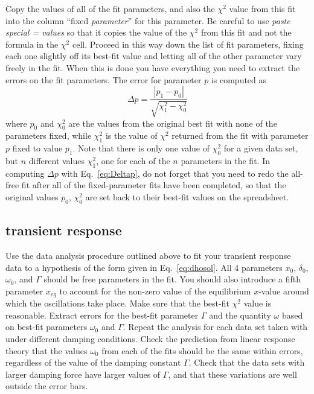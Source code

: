 \documentclass{revtex4}
\begin{document}
Copy the values
of all of the fit parameters, and also the $\chi^2$ value from this fit into
the column ``fixed {\em parameter}'' for this parameter.  Be careful to use
{\em paste special = values} so that it copies the value of the $\chi^2$
from this fit and not the formula in the $\chi^2$ cell.  Proceed in this
way down the list of fit parameters, fixing each one slightly off its 
best-fit value and letting all of the other parameter vary freely in the fit.
When this is done you have everything you need to extract the errors on the
fit parameters.  The error for parameter $p$ is computed as
\begin{equation}
\Delta p = \frac{|p_1 - p_0|}{\sqrt{\chi^2_1-\chi^2_0}}
\label{eq:Deltap}
\end{equation}
where $p_0$ and $\chi^2_0$ are the values from the original best fit with
none of the parameters fixed, while $\chi^2_1$ is the value of $\chi^2$
returned from the fit with parameter $p$ fixed to value $p_1$.  Note that
there is only one value of $\chi^2_0$ for a given data set, but $n$ different
values $\chi^2_1$, one for each of the $n$ parameters in the fit.
In computing $\Delta p$ with Eq.~\ref{eq:Deltap}, do not forget that you
need to redo the all-free fit after all of the fixed-parameter fits have been
completed, so that the original values $p_0$, $\chi^2_0$ are set back
to their best-fit values on the spreadsheet.

\subsection{transient response}

Use the data analysis procedure outlined above to fit your transient
response data to a hypothesis of the form given in Eq.~\ref{eq:dhosol}.
All 4 parameters $x_0$, $\delta_0$, $\omega_0$, and $\Gamma$ should be
free parameters in the fit.  You should also introduce a fifth
parameter $x_{eq}$ to account for the non-zero value of the equilibrium
$x$-value around which the oscillations take place.
Make sure that the best-fit $\chi^2$ value
is reasonable.  Extract errors for the best-fit parameter $\Gamma$ and
the quantity $\omega$ based on best-fit parameters $\omega_0$ and $\Gamma$.
Repeat the analysis for each data set taken with under different damping
conditions.  Check the prediction from linear response theory that the
values $\omega_0$ from each of the fits should be the same within errors,
regardless of the value of the damping constant $\Gamma$.  Check that
the data sets with larger damping force have larger values of $\Gamma$,
and that these variations are well outside the error bars.
\end{document}
